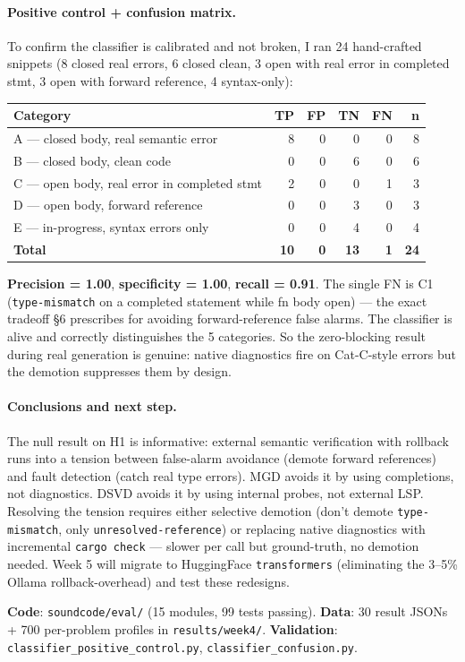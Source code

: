 \documentclass[11pt]{article}
\begin{document}
\paragraph{Positive control + confusion matrix.} To confirm the classifier is calibrated and not broken, I ran 24 hand-crafted snippets (8 closed real errors, 6 closed clean, 3 open with real error in completed stmt, 3 open with forward reference, 4 syntax-only):
{\small
\begin{center}
\begin{tabular}{lrrrrr}
\toprule
\textbf{Category} & \textbf{TP} & \textbf{FP} & \textbf{TN} & \textbf{FN} & \textbf{n} \\
\midrule
A — closed body, real semantic error & 8 & 0 & 0 & 0 & 8 \\
B — closed body, clean code & 0 & 0 & 6 & 0 & 6 \\
C — open body, real error in completed stmt & 2 & 0 & 0 & 1 & 3 \\
D — open body, forward reference & 0 & 0 & 3 & 0 & 3 \\
E — in-progress, syntax errors only & 0 & 0 & 4 & 0 & 4 \\
\midrule
\textbf{Total} & \textbf{10} & \textbf{0} & \textbf{13} & \textbf{1} & \textbf{24} \\
\bottomrule
\end{tabular}\end{center}}

\textbf{Precision = 1.00}, \textbf{specificity = 1.00}, \textbf{recall = 0.91}. The single FN is C1 (\texttt{type-mismatch} on a completed statement while fn body open) — the exact tradeoff §6 prescribes for avoiding forward-reference false alarms. The classifier is alive and correctly distinguishes the 5 categories. So the zero-blocking result during real generation is genuine: native diagnostics fire on Cat-C-style errors but the demotion suppresses them by design.

\paragraph{Conclusions and next step.} The null result on H1 is informative: external semantic verification with rollback runs into a tension between false-alarm avoidance (demote forward references) and fault detection (catch real type errors). MGD avoids it by using completions, not diagnostics. DSVD avoids it by using internal probes, not external LSP. Resolving the tension requires either selective demotion (don't demote \texttt{type-mismatch}, only \texttt{unresolved-reference}) or replacing native diagnostics with incremental \texttt{cargo check} — slower per call but ground-truth, no demotion needed. Week 5 will migrate to HuggingFace \texttt{transformers} (eliminating the 3--5\% Ollama rollback-overhead) and test these redesigns.

\textbf{Code}: \texttt{soundcode/eval/} (15 modules, 99 tests passing). \textbf{Data}: 30 result JSONs + 700 per-problem profiles in \texttt{results/week4/}. \textbf{Validation}: \texttt{classifier\_positive\_control.py}, \texttt{classifier\_confusion.py}.
\end{document}
